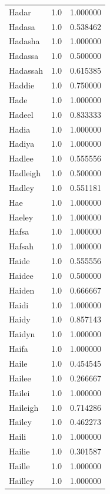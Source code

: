 \documentclass[
  letterpaper,
  DIV=11,
  numbers=noendperiod]{scrreprt}
\begin{document}
\begin{tabular}{lrr}
Hadar           &   1.0 &   1.000000 \\
Hadasa          &   1.0 &   0.538462 \\
Hadasha         &   1.0 &   1.000000 \\
Hadassa         &   1.0 &   0.500000 \\
Hadassah        &   1.0 &   0.615385 \\
Haddie          &   1.0 &   0.750000 \\
Hade            &   1.0 &   1.000000 \\
Hadeel          &   1.0 &   0.833333 \\
Hadia           &   1.0 &   1.000000 \\
Hadiya          &   1.0 &   1.000000 \\
Hadlee          &   1.0 &   0.555556 \\
Hadleigh        &   1.0 &   0.500000 \\
Hadley          &   1.0 &   0.551181 \\
Hae             &   1.0 &   1.000000 \\
Haeley          &   1.0 &   1.000000 \\
Hafsa           &   1.0 &   1.000000 \\
Hafsah          &   1.0 &   1.000000 \\
Haide           &   1.0 &   0.555556 \\
Haidee          &   1.0 &   0.500000 \\
Haiden          &   1.0 &   0.666667 \\
Haidi           &   1.0 &   1.000000 \\
Haidy           &   1.0 &   0.857143 \\
Haidyn          &   1.0 &   1.000000 \\
Haifa           &   1.0 &   1.000000 \\
Haile           &   1.0 &   0.454545 \\
Hailee          &   1.0 &   0.266667 \\
Hailei          &   1.0 &   1.000000 \\
Haileigh        &   1.0 &   0.714286 \\
Hailey          &   1.0 &   0.462273 \\
Haili           &   1.0 &   1.000000 \\
Hailie          &   1.0 &   0.301587 \\
Haille          &   1.0 &   1.000000 \\
Hailley         &   1.0 &   1.000000 \\

\end{tabular}
\end{document}
